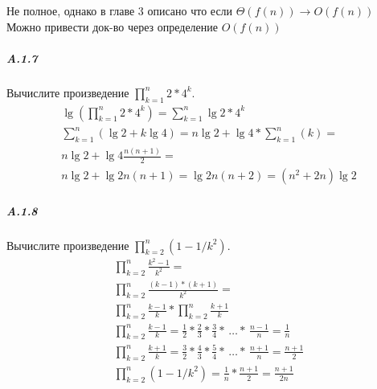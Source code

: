 Не полное, однако в главе 3 описано что если $\Theta(f(n)) \to O(f(n))$
Можно привести док-во через определение $O(f(n))$

\subparagraph{A.1.7}
Вычислите произведение $\prod_{k=1}^{n} {2*4^k}$.
\begin{gather*}
\lg{\left(\prod_{k=1}^{n} {2*4^k}\right)} = \sum_{k=1}^{n} {\lg{2*4^k}} \\
\sum_{k=1}^{n} { \left(\lg{2} + k\lg{4}\right) } = n\lg{2} + \lg{4} * \sum_{k=1}^{n} { \left(k\right) } = \\
n\lg{2} + \lg{4}\frac{n(n+1)}{2} = \\
n\lg{2} + \lg{2}n(n+1) = \lg{2}n(n+2) = (n^2 + 2n)\lg{2}
\end{gather*}

\subparagraph{A.1.8}
Вычислите произведение $\prod_{k=2}^{n} {(1 - 1/k^2)}$.
\begin{gather*}
\prod_{k=2}^{n} {\frac{k^2 - 1}{k^2}} = \\
\prod_{k=2}^{n} {\frac{(k - 1) * (k + 1)}{k^2}} = \\
\prod_{k=2}^{n} {\frac{k - 1}{k}} * \prod_{k=2}^{n} {\frac{k + 1}{k}} \\
\prod_{k=2}^{n} {\frac{k - 1}{k}} = \frac{1}{2} * \frac{2}{3} * \frac{3}{4} * \, \dots * \, \frac{n-1}{n} = \frac{1}{n} \\ 
\prod_{k=2}^{n} {\frac{k + 1}{k}} = \frac{3}{2} * \frac{4}{3} * \frac{5}{4} * \, \dots * \, \frac{n+1}{n} = \frac{n+1}{2} \\
\prod_{k=2}^{n} {(1 - 1/k^2)} = \frac{1}{n} * \frac{n+1}{2} = \frac{n+1}{2n}
\end{gather*}